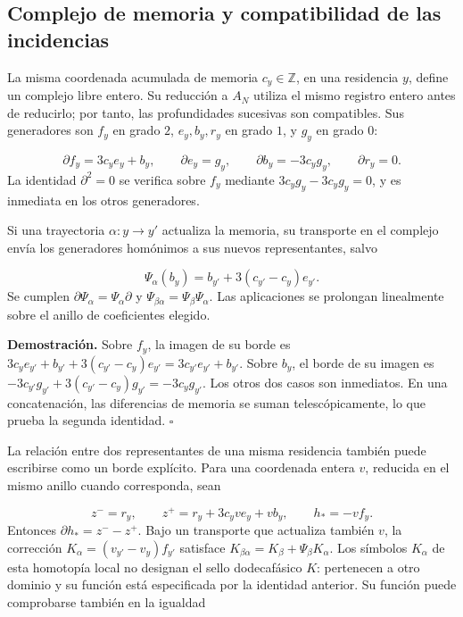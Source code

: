 \subsection{Complejo de memoria y compatibilidad de las incidencias}
La misma coordenada acumulada de memoria \(c_y\in\mathbb Z\), en una residencia \(y\), define un complejo libre entero. Su reducción a \(A_N\) utiliza el mismo registro entero antes de reducirlo; por tanto, las profundidades sucesivas son compatibles. Sus generadores son \(f_y\) en grado \(2\), \(e_y,b_y,r_y\) en grado \(1\), y \(g_y\) en grado \(0\):

\[
\partial f_y=3c_y e_y+b_y,\qquad
\partial e_y=g_y,\qquad
\partial b_y=-3c_y g_y,\qquad
\partial r_y=0.
\]
La identidad \(\partial^2=0\) se verifica sobre \(f_y\) mediante \(3c_yg_y-3c_yg_y=0\), y es inmediata en los otros generadores.

Si una trayectoria \(\alpha:y\to y'\) actualiza la memoria, su transporte en el complejo envía los generadores homónimos a sus nuevos representantes, salvo

\[
\Psi_\alpha(b_y)=b_{y'}+3(c_{y'}-c_y)e_{y'}.
\]
Se cumplen \(\partial\Psi_\alpha=\Psi_\alpha\partial\) y \(\Psi_{\beta\alpha}=\Psi_\beta\Psi_\alpha\). Las aplicaciones se prolongan linealmente sobre el anillo de coeficientes elegido.

\textbf{Demostración.} Sobre \(f_y\), la imagen de su borde es \(3c_ye_{y'}+b_{y'}+3(c_{y'}-c_y)e_{y'} =3c_{y'}e_{y'}+b_{y'}\). Sobre \(b_y\), el borde de su imagen es \(-3c_{y'}g_{y'}+3(c_{y'}-c_y)g_{y'}=-3c_yg_{y'}\). Los otros dos casos son inmediatos. En una concatenación, las diferencias de memoria se suman telescópicamente, lo que prueba la segunda identidad. \hfill\(\square\)

La relación entre dos representantes de una misma residencia también puede escribirse como un borde explícito. Para una coordenada entera \(v\), reducida en el mismo anillo cuando corresponda, sean

\[
z^-=r_y,\qquad z^+=r_y+3c_yv e_y+v b_y,
\qquad h_*=-vf_y.
\]
Entonces \(\partial h_*=z^--z^+\). Bajo un transporte que actualiza también \(v\), la corrección \(K_\alpha=(v_{y'}-v_y)f_{y'}\) satisface \(K_{\beta\alpha}=K_\beta+\Psi_\beta K_\alpha\). Los símbolos \(K_\alpha\) de esta homotopía local no designan el sello dodecafásico \(K\): pertenecen a otro dominio y su función está especificada por la identidad anterior. Su función puede comprobarse también en la igualdad

